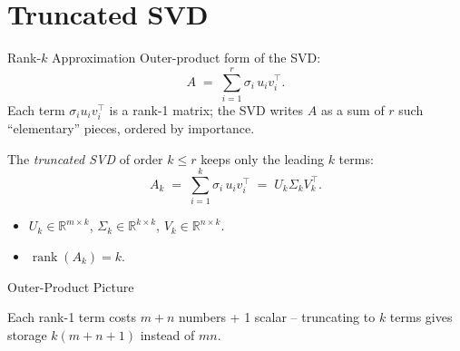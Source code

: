 \documentclass[10pt,aspectratio=169]{beamer}
\DeclareMathOperator{\rank}{rank}
\newcommand{\R}{\mathbb{R}}
\begin{document}
\section{Truncated SVD}

\begin{frame}{Rank-$k$ Approximation}
  Outer-product form of the SVD:
  \[
    A \;=\; \sum_{i=1}^{r} \sigma_i\, u_i v_i^\top.
  \]
  Each term $\sigma_i u_i v_i^\top$ is a rank-1 matrix; the SVD writes $A$ as a sum of $r$ such ``elementary'' pieces, ordered by importance.

  \medskip
  The \emph{truncated SVD} of order $k \leq r$ keeps only the leading $k$ terms:
  \[
    A_k \;=\; \sum_{i=1}^{k} \sigma_i\, u_i v_i^\top \;=\; U_k \Sigma_k V_k^\top.
  \]
  \begin{itemize}
    \item $U_k \in \R^{m\times k}$, $\Sigma_k \in \R^{k\times k}$, $V_k \in \R^{n\times k}$.
    \item $\rank(A_k) = k$.
  \end{itemize}
\end{frame}

\begin{frame}{Outer-Product Picture}
  \begin{center}
  \end{center}
  \vspace{0.3cm}
  Each rank-1 term costs $m + n$ numbers + 1 scalar -- truncating to $k$ terms gives storage $k(m+n+1)$ instead of $mn$.
\end{frame}
\end{document}
